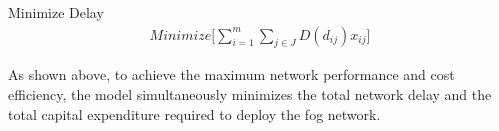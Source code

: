 \documentclass[10pt,journal,compsoc]{IEEEtran}
\begin{document}
Minimize Delay 
\begin{align}\label{obj2}
\textit{Minimize} \bigg[\sum_{i=1}^m\sum_{j\in J} D(d_{ij}) x_{ij}\bigg]
\end{align}



As shown above, to achieve the maximum network performance and cost efficiency, the model simultaneously minimizes the total network delay and the total capital expenditure required to deploy the fog network.  
\end{document}
